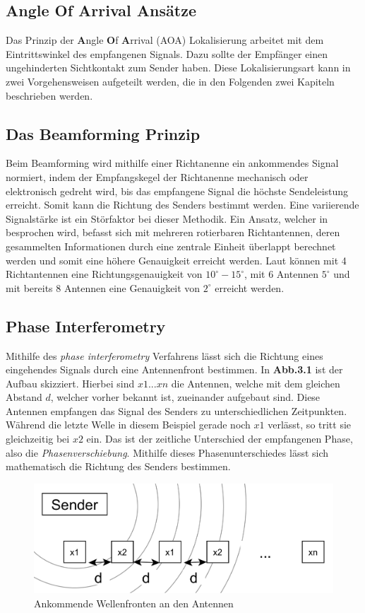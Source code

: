 \documentclass[12pt, a4wide]{scrreprt}
\begin{document}
  \subsection{Angle Of Arrival Ansätze}
Das Prinzip der {\bf A}ngle {\bf O}f {\bf A}rrival (AOA) Lokalisierung arbeitet mit dem Eintrittswinkel des empfangenen Signals. Dazu sollte der Empfänger einen ungehinderten Sichtkontakt zum Sender haben. Diese Lokalisierungsart kann in zwei Vorgehensweisen aufgeteilt werden, die in den Folgenden zwei Kapiteln beschrieben werden.  
  \subsection*{Das Beamforming Prinzip}
Beim Beamforming wird mithilfe einer Richtanenne ein ankommendes Signal normiert, indem der Empfangskegel der Richtanenne mechanisch oder elektronisch gedreht wird, bis das empfangene Signal die höchste Sendeleistung erreicht. Somit kann die Richtung des Senders bestimmt werden. Eine variierende Signalstärke ist ein Störfaktor bei dieser Methodik. Ein Ansatz, welcher in \cite{q1} besprochen wird, befasst sich mit mehreren rotierbaren Richtantennen, deren gesammelten Informationen durch eine zentrale Einheit überlappt berechnet werden und somit eine höhere Genauigkeit erreicht werden. Laut \cite{q1} können mit 4 Richtantennen eine Richtungsgenauigkeit von $10^\circ -15^\circ$, mit 6 Antennen $5^\circ$ und mit bereits 8 Antennen eine Genauigkeit von $2^\circ$ erreicht werden.
    \subsection{Phase Interferometry}
Mithilfe des \textit{phase interferometry}\cite{q1} Verfahrens lässt sich die Richtung eines eingehendes Signals durch eine Antennenfront bestimmen. In {\bf Abb.3.1} ist der Aufbau skizziert. Hierbei sind $x1...xn$ die Antennen, welche mit dem gleichen Abstand $d$, welcher vorher bekannt ist, zueinander aufgebaut sind. Diese Antennen empfangen das Signal des Senders zu unterschiedlichen Zeitpunkten. Während die letzte Welle in diesem Beispiel gerade noch $x1$ verlässt, so tritt sie gleichzeitig bei $x2$ ein. Das ist der zeitliche Unterschied der empfangenen Phase, also die \textit{Phasenverschiebung}. Mithilfe dieses Phasenunterschiedes lässt sich mathematisch die Richtung des Senders bestimmen.\\

\begin{figure}[!htb]
\centering
\includegraphics[scale=.3]{phase_int2.png}
\caption{Ankommende Wellenfronten an den Antennen}
\end{figure}
\end{document}

